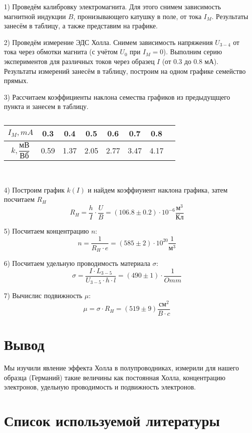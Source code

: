 1) Проведём калибровку электромагнита. Для этого снимем зависимость магнитной индукции $B$, пронизывающего катушку в поле, от тока $I_M$. Результаты занесём в таблицу, а также представим на графике. 
    
2) Проведём измерение ЭДС Холла. Снимем зависимость напряжения $U_{3-4}$ от тока через обмотки магнита (с учётом $U_0$ при $I_M = 0$). Выполним серию экспериментов для различных токов через образец $I$ (от $0.3$ до $0.8$ мА). Результаты измерений занесём в таблицу, построим на одном графике семейство прямых.

3) Рассчитаем коэффициенты наклона семества графиков из предыдущщего пункта и занесем в таблицу.
    

\begin{table}[h]
    \centering
\begin{tabular}{|c|c|c|c|c|c|c|c|}\hline
$I_M, mA$ & 0.3 & 0.4 & 0.5 & 0.6 & 0.7 & 0.8\\ \hline
$k, \dfrac{\text{мВ}}{\text{Вб}}$ & 0.59 & 1.37 & 2.05 & 2.77 & 3.47 & 4.17\\ \hline
\end{tabular}\\
 \caption{}
\end{table}

4) Построим график $k(I)$ и найдем коэффиуиент наклона графика, затем посчитаем $R_H$
\[R_{H} = \dfrac{h}{I}\cdot \dfrac{U}{B} = (106.8 \pm 0.2) \cdot 10^{-6} \dfrac{\text{м}^3}{\text{Кл}}\]

5) Посчитаем концентрацию $n$:
\[n = \frac{1}{R_H \cdot e} = (585 \pm 2)\cdot 10^{20} \frac{1}{\text{м}^3}\]

6) Посчитаем удельную проводимость материала $\sigma$:
\[\sigma = \frac{I\cdot L_{3-5}}{U_{3-5}\cdot h\cdot l} = (490 \pm 1)\cdot \frac{1}{Om m}\]

7) Вычислис подвижность $\mu$:
\[\mu = \sigma \cdot R_H = (519 \pm 9) \frac{\text{см}^2}{B\cdot c}\]

\section{{Вывод}}


Мы изучили явление эффекта Холла в полупроводниках, измерили для нашего образца (Германий) такие величины как постоянная Холла, концентрацию электронов, удельную проводимость и подвижность электронов.



\section{{Список используемой литературы}}

